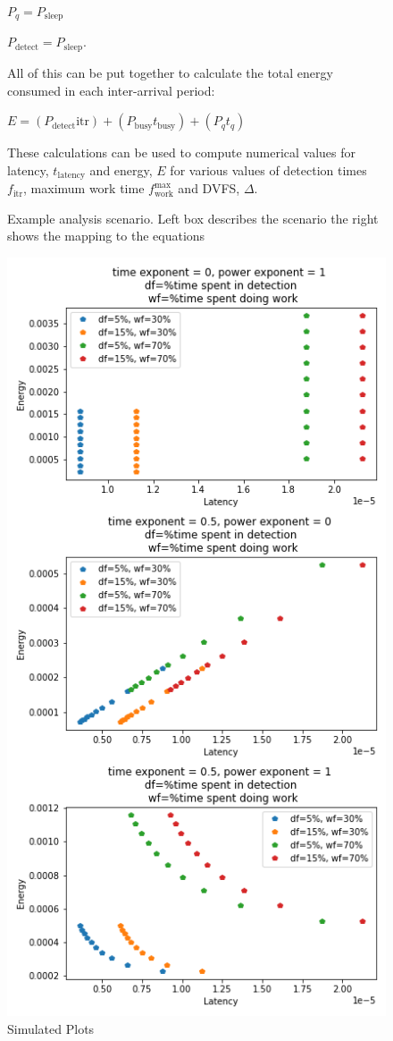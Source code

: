 \begin{figure}
{{\begin{minipage}{20em}
$P_q = P_{\text{sleep}}$

$P_{\text{detect}} = P_{\text{sleep}}$.

All of this can be put together to calculate the total energy consumed in each inter-arrival period:

$E = (P_{\text{detect}} \text{itr}) + (P_{\text{busy}} t_{\text{busy}}) + (P_q t_q)$

These calculations can be used to compute numerical values for latency, $t_{\text{latency}}$ and energy, $E$ for various values of detection times $f_{\text{itr}}$, maximum work time $f_{\text{work}}^{\text{max}}$ and DVFS, $\Delta$.
\end{minipage}
}
}
\caption[]{Example analysis scenario. Left box describes the scenario the right shows the mapping to the equations }
\label{fig:scenario}
\end{figure}

   


\begin{figure}
\centering
\includegraphics[width=.8\columnwidth]{figures/model_plots}
\caption[]{Simulated Plots}
\label{fig:simplots}
\vspace{-0.28in}
\end{figure}

